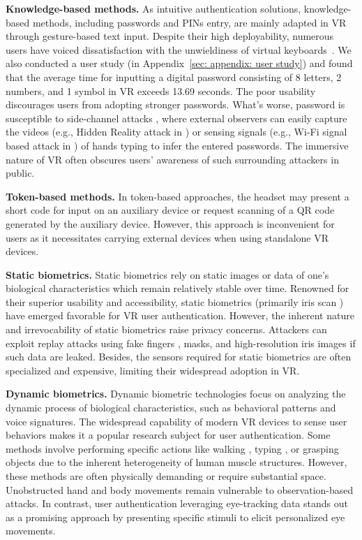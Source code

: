 \documentclass[sigconf]{acmart}
\begin{document}
\noindent \textbf{Knowledge-based methods.} As intuitive authentication solutions, knowledge-based methods, including passwords and PINs entry, are mainly adapted in VR through gesture-based text input. Despite their high deployability, numerous users have voiced dissatisfaction with the unwieldiness of virtual keyboards~\cite{Sok_SP,wu2017virtual}. We also conducted a user study (in Appendix~\ref{sec: appendix: user study}) and found that the average time for inputting a digital password consisting of 8 letters, 2 numbers, and 1 symbol in VR exceeds 13.69 seconds. The poor usability discourages users from adopting stronger passwords. What's worse, password is susceptible to side-channel attacks \cite{USENIX23_HiddenReality,Ling2019IKW,Meteriz_9756766,9417659}, where external observers can easily capture the videos (e.g., Hidden Reality attack in \cite{USENIX23_HiddenReality}) or sensing signals (e.g., Wi-Fi signal based attack in \cite{9417659}) of hands typing to infer the entered passwords. The immersive nature of VR often obscures users' awareness of such surrounding attackers in public. 

\noindent   \textbf{Token-based methods.} In token-based approaches, the headset may present a short code for input on an auxiliary device or request scanning of a QR code generated by the auxiliary device. However, this approach is inconvenient for users as it necessitates carrying external devices when using standalone VR devices.

\noindent   \textbf{Static biometrics.} Static biometrics rely on static images or data of one's biological characteristics which remain relatively stable over time. Renowned for their superior usability and accessibility, static biometrics (primarily iris scan \cite{Iris_BOUTROS2020104007}) have emerged favorable for VR user authentication. However, the inherent nature and irrevocability of static biometrics raise privacy concerns. Attackers can exploit replay attacks using fake fingers \cite{Tolosana_PAD}, masks, and high-resolution iris images \cite{ROBERTS200714} if such data are leaked. Besides, the sensors required for static biometrics are often specialized and expensive, limiting their widespread adoption in VR.

\noindent   \textbf{Dynamic biometrics.} Dynamic biometric technologies focus on analyzing the dynamic process of biological characteristics, such as behavioral patterns and voice signatures. The widespread capability of modern VR devices to sense user behaviors makes it a popular research subject for user authentication. Some methods involve performing specific actions like walking \cite{GaitLock, PfeufferCHI19}, typing \cite{PfeufferCHI19}, or grasping objects \cite{PfeufferCHI19, BioMove} due to the inherent heterogeneity of human muscle structures. However, these methods are often physically demanding or require substantial space. Unobstructed hand and body movements remain vulnerable to observation-based attacks. In contrast, user authentication leveraging eye-tracking data stands out as a promising approach by presenting specific stimuli to elicit personalized eye movements. 
\end{document}

